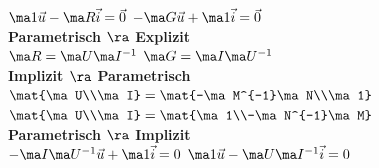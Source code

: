 \documentclass[fs, footer]{latex4ei}
\begin{document}
\begin{multicols*}{4}
{        $\ma 1 \vec u - \ma R \vec i = \vec 0$\quad
        $-\ma G \vec u + \ma 1 \vec i = \vec 0$\\
        \textbf{Parametrisch $\ra$ Explizit}\\
        $\ma R = \ma U \ma I^{-1}$\quad
        $\ma G = \ma I \ma U^{-1}$\\
        \textbf{Implizit $\ra$ Parametrisch}\\
        $\mat{\ma U\\\ma I} = \mat{-\ma M^{-1}\ma N\\\ma 1}$\quad
        $\mat{\ma U\\\ma I} = \mat{\ma 1\\-\ma N^{-1}\ma M}$\\
        \textbf{Parametrisch $\ra$ Implizit}\\
        $-\ma I \ma U^{-1} \vec u + \ma 1 \vec i = 0$\quad
        $\ma 1 \vec u - \ma U \ma I^{-1} \vec i = 0$
    }



\end{multicols*}

\label{LastPage}

\end{document}
